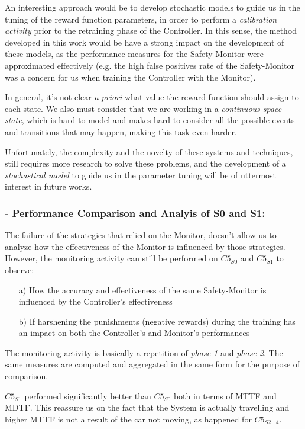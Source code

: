An interesting approach would be to develop stochastic models to guide us in the tuning of the reward function parameters, in order to perform a \textsl{calibration activity} prior to the retraining phase of the Controller. In this sense, the method developed in this work would be have a strong impact on the development of these models, as the performance measures for the Safety-Monitor were approximated effectively (e.g. the high false positives rate of the Safety-Monitor was a concern for us when training the Controller with the Monitor).\newline

In general, it's not clear \textsl{a priori} what value the reward function should assign to each state. We also must consider that we are working in a \textsl{continuous space state}, which is hard to model and makes hard to consider all the possible events and transitions that may happen, making this task even harder.

Unfortunately, the complexity and the novelty of these systems and techniques, still requires more research to solve these problems, and the development of a \textsl{stochastical model} to guide us in the parameter tuning will be of uttermost interest in future works.

\subsubsection{- Performance Comparison and Analyis of S0 and S1:}

The failure of the strategies that relied on the Monitor, doesn't allow us to analyze how the effectiveness of the Monitor is influenced by those strategies. However, the monitoring activity can still be performed on $C5_{S0}$ and $C5_{S1}$ to observe:

\begin{itemize}
	\item[a)] How the accuracy and effectiveness of the same Safety-Monitor is influenced by the Controller's effectiveness
	\item[b)] If harshening the punishments (negative rewards) during the training has an impact on both the Controller's and Monitor's performances
\end{itemize}

The monitoring activity is basically a repetition of \textsl{phase 1} and \textsl{phase 2}. The same measures are computed and aggregated in the same form for the purpose of comparison.

$C5_{S1}$ performed significantly better than $C5_{S0}$ both in terms of MTTF and MDTF. This reassure us on the fact that the System is actually travelling and higher MTTF is not a result of the car not moving, as happened for $C5_{S2\dots 4}$.

